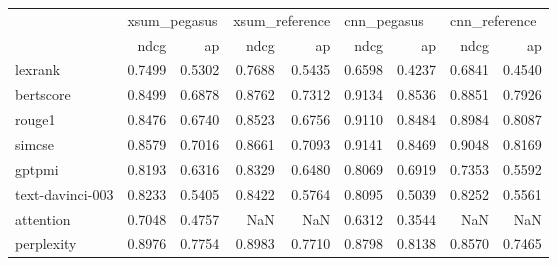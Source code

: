 \begin{tabular}{lrrrrrrrr}
\toprule
{} & \multicolumn{2}{l}{xsum\_pegasus} & \multicolumn{2}{l}{xsum\_reference} & \multicolumn{2}{l}{cnn\_pegasus} & \multicolumn{2}{l}{cnn\_reference} \\
{} &         ndcg &     ap &           ndcg &     ap &        ndcg &     ap &          ndcg &     ap \\
\midrule
lexrank          &       0.7499 & 0.5302 &         0.7688 & 0.5435 &      0.6598 & 0.4237 &        0.6841 & 0.4540 \\
bertscore        &       0.8499 & 0.6878 &         0.8762 & 0.7312 &      0.9134 & 0.8536 &        0.8851 & 0.7926 \\
rouge1           &       0.8476 & 0.6740 &         0.8523 & 0.6756 &      0.9110 & 0.8484 &        0.8984 & 0.8087 \\
simcse           &       0.8579 & 0.7016 &         0.8661 & 0.7093 &      0.9141 & 0.8469 &        0.9048 & 0.8169 \\
gptpmi           &       0.8193 & 0.6316 &         0.8329 & 0.6480 &      0.8069 & 0.6919 &        0.7353 & 0.5592 \\
text-davinci-003 &       0.8233 & 0.5405 &         0.8422 & 0.5764 &      0.8095 & 0.5039 &        0.8252 & 0.5561 \\
attention        &       0.7048 & 0.4757 &            NaN &    NaN &      0.6312 & 0.3544 &           NaN &    NaN \\
perplexity       &       0.8976 & 0.7754 &         0.8983 & 0.7710 &      0.8798 & 0.8138 &        0.8570 & 0.7465 \\
\bottomrule
\end{tabular}

